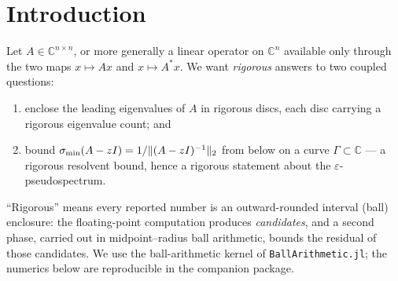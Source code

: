 \documentclass[11pt]{article}
\newcommand{\C}{\mathbb{C}}
\newcommand{\sigmin}{\sigma_{\min}}
\DeclarePairedDelimiter{\norm}{\lVert}{\rVert}
\begin{document}
\begin{abstract}
\emph{faithful} ($\sigmin(G_{11}-zI)\approx\sigmin(A-zI)$), so its verified SVD is $\kappa_2$-free.
The central conclusion is a \emph{pseudospectral inclusion}: once the deflation has made the far block
deep relative to a chosen radius $R$, the $\delta$-pseudospectrum of $A$ outside $R$ is contained in
the $\varepsilon$-pseudospectrum of the small captured block, with an explicit relation between
$\varepsilon$ and $\delta$. A single inequality, valid at every $z$ simultaneously, thus transfers the
entire exterior spectral behaviour of a large matrix-free operator onto a small dense matrix one can
factor; in the limit $\varepsilon\to0$ it says that the eigenvalues found outside $R$ are \emph{all} of
them, with no grid, no covering argument and no a-priori bound on the spectral radius. Circles are
rigorously covered by an adaptive pearl cover, and each eigenvalue is rigorously enclosed by a cheap
probe that locates the scale followed by a single verified check. We report rigorous
enclosures for the Perron--Frobenius (Ulam) operators of the noisy H\'enon and contracting-Lorenz maps
and the Gauss--Kuzmin--Wirsing operator, and we map the method's applicability on a gallery of standard
non-normal matrices: it succeeds precisely when the singular spectrum decays (a low-dimensional
resolvent tail) and \emph{fails safely} --- a non-positive floor or an explicit refusal, never a false
enclosure --- when it does not.
\end{abstract}

\tableofcontents

\section{Introduction}\label{sec:intro}

Let $A\in\C^{n\times n}$, or more generally a linear operator on $\C^n$ available only through the
two maps $x\mapsto Ax$ and $x\mapsto A^*x$. We want \emph{rigorous} answers to two coupled questions:
\begin{enumerate}
\item enclose the leading eigenvalues of $A$ in rigorous discs, each disc carrying a rigorous
      eigenvalue count; and
\item bound $\sigmin(A-zI)=1/\norm{(A-zI)^{-1}}_2$ from below on a curve $\Gamma\subset\C$ --- a
      rigorous resolvent bound, hence a rigorous statement about the $\varepsilon$-pseudospectrum.
\end{enumerate}
``Rigorous'' means every reported number is an outward-rounded interval (ball) enclosure: the
floating-point computation produces \emph{candidates}, and a second phase, carried out in
midpoint--radius ball arithmetic, bounds the residual of those candidates. We use the ball-arithmetic
kernel of \texttt{BallArithmetic.jl}; the numerics below are reproducible in the companion package.
\end{document}
